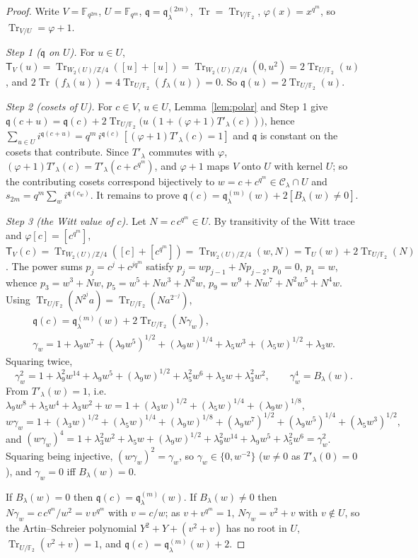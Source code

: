 \documentclass[12pt,a4paper]{amsart}
\theoremstyle{definition}
\newcommand{\F}{\mathbb{F}}
\newcommand{\Z}{\mathbb{Z}}
\newcommand{\Tr}{\operatorname{Tr}}
\newcommand{\Cc}{\mathcal{C}}
\newcommand{\qq}{\mathfrak{q}}
\newcommand{\Tw}{\mathsf{T}}
\begin{document}
\begin{proof}
Write $V=\F_{q^{2m}}$, $U=\F_{q^m}$, $\qq=\qq^{(2m)}_\lambda$, $\Tr=\Tr_{V/\F_2}$, $\varphi(x)=x^{q^m}$, so $\Tr_{V/U}=\varphi+1$.

\emph{Step 1 ($\qq$ on $U$).} For $u\in U$, $\Tw_V(u)=\Tr_{W_2(U)/\Z/4}([u]+[u])=\Tr_{W_2(U)/\Z/4}(0,u^2)=2\Tr_{U/\F_2}(u)$, and $2\Tr(f_\lambda(u))=4\Tr_{U/\F_2}(f_\lambda(u))=0$. So $\qq(u)=2\Tr_{U/\F_2}(u)$.

\emph{Step 2 (cosets of $U$).} For $c\in V$, $u\in U$, Lemma~\ref{lem:polar} and Step 1 give
$\qq(c+u)=\qq(c)+2\Tr_{U/\F_2}\bigl(u\,(1+(\varphi+1)T'_\lambda(c))\bigr)$, hence $\sum_{u\in U}i^{\qq(c+u)}=q^m\,i^{\qq(c)}\,[(\varphi+1)T'_\lambda(c)=1]$ and $\qq$ is constant on the cosets that contribute. Since $T'_\lambda$ commutes with $\varphi$, $(\varphi+1)T'_\lambda(c)=T'_\lambda(c+c^{q^m})$, and $\varphi+1$ maps $V$ onto $U$ with kernel $U$; so the contributing cosets correspond bijectively to $w=c+c^{q^m}\in\Cc_\lambda\cap U$ and $s_{2m}=q^m\sum_{w}i^{\qq(c_w)}$. It remains to prove $\qq(c)=\qq^{(m)}_\lambda(w)+2[B_\lambda(w)\ne0]$.

\emph{Step 3 (the Witt value of $c$).} Let $N=c\,c^{q^m}\in U$. By transitivity of the Witt trace and $\varphi[c]=[c^{q^m}]$,
$\Tw_V(c)=\Tr_{W_2(U)/\Z/4}([c]+[c^{q^m}])=\Tr_{W_2(U)/\Z/4}(w,N)=\Tw_U(w)+2\Tr_{U/\F_2}(N)$.
The power sums $p_j=c^j+c^{jq^m}$ satisfy $p_j=wp_{j-1}+Np_{j-2}$, $p_0=0$, $p_1=w$, whence
$p_3=w^3+Nw$, $p_5=w^5+Nw^3+N^2w$, $p_9=w^9+Nw^7+N^2w^5+N^4w$. Using $\Tr_{U/\F_2}(N^{2^j}a)=\Tr_{U/\F_2}(Na^{2^{-j}})$,
\begin{gather*}
\qq(c)=\qq^{(m)}_\lambda(w)+2\Tr_{U/\F_2}(N\gamma_w),\\
\gamma_w=1+\lambda_9w^7+(\lambda_9w^5)^{1/2}+(\lambda_9w)^{1/4}+\lambda_5w^3+(\lambda_5w)^{1/2}+\lambda_3w .
\end{gather*}
Squaring twice,
\[
\gamma_w^2=1+\lambda_9^2w^{14}+\lambda_9w^5+(\lambda_9w)^{1/2}+\lambda_5^2w^6+\lambda_5w+\lambda_3^2w^2,\qquad
\gamma_w^4=B_\lambda(w).
\]
From $T'_\lambda(w)=1$, i.e. $\lambda_9w^8+\lambda_5w^4+\lambda_3w^2+w=1+(\lambda_3w)^{1/2}+(\lambda_5w)^{1/4}+(\lambda_9w)^{1/8}$,
\[
w\gamma_w=1+(\lambda_3w)^{1/2}+(\lambda_5w)^{1/4}+(\lambda_9w)^{1/8}+(\lambda_9w^7)^{1/2}+(\lambda_9w^5)^{1/4}+(\lambda_5w^3)^{1/2},
\]
and $(w\gamma_w)^4=1+\lambda_3^2w^2+\lambda_5w+(\lambda_9w)^{1/2}+\lambda_9^2w^{14}+\lambda_9w^5+\lambda_5^2w^6=\gamma_w^2$. Squaring being injective, $(w\gamma_w)^2=\gamma_w$, so $\gamma_w\in\{0,w^{-2}\}$ ($w\ne0$ as $T'_\lambda(0)=0$), and $\gamma_w=0$ iff $B_\lambda(w)=0$.

If $B_\lambda(w)=0$ then $\qq(c)=\qq^{(m)}_\lambda(w)$. If $B_\lambda(w)\ne0$ then $N\gamma_w=c\,c^{q^m}/w^2=v\,v^{q^m}$ with $v=c/w$; as $v+v^{q^m}=1$, $N\gamma_w=v^2+v$ with $v\notin U$, so the Artin--Schreier polynomial $Y^2+Y+(v^2+v)$ has no root in $U$, $\Tr_{U/\F_2}(v^2+v)=1$, and $\qq(c)=\qq^{(m)}_\lambda(w)+2$.
\end{proof}
\end{document}
